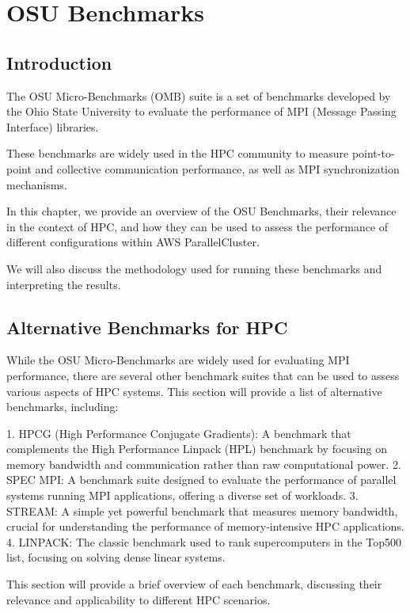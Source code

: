 

\chapter{OSU Benchmarks}

\section{Introduction}

The OSU Micro-Benchmarks (OMB) suite is a set of benchmarks developed by the Ohio State University to evaluate the performance of MPI (Message Passing Interface) libraries. 

These benchmarks are widely used in the HPC community to measure point-to-point and collective communication performance, as well as MPI synchronization mechanisms.

In this chapter, we provide an overview of the OSU Benchmarks, their relevance in the context of HPC, and how they can be used to assess the performance of different configurations within AWS ParallelCluster. 

We will also discuss the methodology used for running these benchmarks and interpreting the results.

\section{Alternative Benchmarks for HPC}
While the OSU Micro-Benchmarks are widely used for evaluating MPI performance, there are several other benchmark suites that can be used to assess various aspects of HPC systems. This section will provide a list of alternative benchmarks, including:

1. HPCG (High Performance Conjugate Gradients): A benchmark that complements the High Performance Linpack (HPL) benchmark by focusing on memory bandwidth and communication rather than raw computational power.
2. SPEC MPI: A benchmark suite designed to evaluate the performance of parallel systems running MPI applications, offering a diverse set of workloads.
3. STREAM: A simple yet powerful benchmark that measures memory bandwidth, crucial for understanding the performance of memory-intensive HPC applications.
4. LINPACK: The classic benchmark used to rank supercomputers in the Top500 list, focusing on solving dense linear systems.

This section will provide a brief overview of each benchmark, discussing their relevance and applicability to different HPC scenarios.